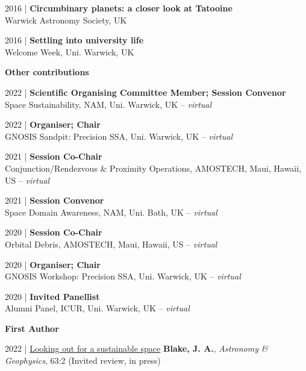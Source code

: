 \documentclass[10pt,a4paper]{altacv}
\begin{document}
\smallskip

\small 2016 | \textbf{Circumbinary planets: a closer look at Tatooine} \\
Warwick Astronomy Society, UK

\smallskip

\small 2016 | \textbf{Settling into university life} \\
Welcome Week, Uni. Warwick, UK

\divider

\normalsize \textbf{Other contributions}

\medskip

\small 2022 | \textbf{Scientific Organising Committee Member; Session Convenor} \\
Space Sustainability, NAM, Uni. Warwick, UK -- \textit{virtual}

\smallskip

\small 2022 | \textbf{Organiser; Chair} \\
GNOSIS Sandpit: Precision SSA, Uni. Warwick, UK -- \textit{virtual}

\smallskip

\small 2021 | \textbf{Session Co-Chair} \\
Conjunction/Rendezvous \& Proximity Operations, AMOSTECH, Maui, Hawaii, US -- \textit{virtual}

\smallskip

\small 2021 | \textbf{Session Convenor} \\
Space Domain Awareness, NAM, Uni. Bath, UK -- \textit{virtual}

\smallskip

\small 2020 | \textbf{Session Co-Chair} \\
Orbital Debris, AMOSTECH, Maui, Hawaii, US -- \textit{virtual}

\smallskip

\small 2020 | \textbf{Organiser; Chair} \\
GNOSIS Workshop: Precision SSA, Uni. Warwick, UK -- \textit{virtual}

\smallskip

\small 2020 | \textbf{Invited Panellist} \\
Alumni Panel, ICUR, Uni. Warwick, UK -- \textit{virtual}

\medskip


\normalsize \textbf{First Author} 

\medskip

\small
2022 | \href{https://www.researchgate.net/publication/358504609_Looking_out_for_a_sustainable_space}{Looking out for a sustainable space}
\textbf{Blake, J. A.}, \textit{Astronomy \& Geophysics}, 63:2 (Invited review, in press)
\end{document}
